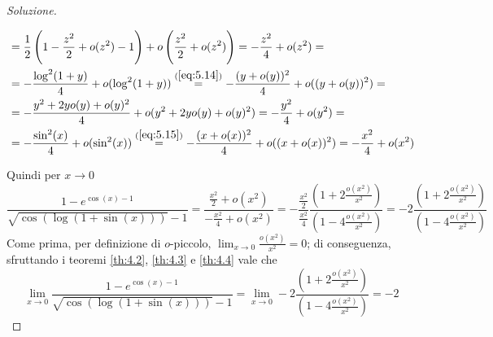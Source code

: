 \begin{proof}[Soluzione]
\begin{enumerate}[(i)]
\[\begin{split}
            & = \frac{1}{2}\left(1-\frac{z^2}{2}+o(z^2)-1\right)+o\left(\frac{z^2}{2}+o(z^2)\right) = -\frac{z^2}{4}+o(z^2) =\\
            & = -\frac{\log^2(1+y)}{4}+o(\log^2(1+y)) \overset{(\ref{eq:5.14})}{=} -\frac{(y+o(y))^2}{4} +o((y+o(y))^2) =  \\
            & = -\frac{y^2 +2yo(y)+o(y)^2}{4}+o(y^2 +2yo(y)+o(y)^2) = -\frac{y^2}{4}+o(y^2) = \\
            & = -\frac{\sin^2(x)}{4}+o(\sin^2(x)) \overset{(\ref{eq:5.15})}{=} -\frac{(x+o(x))^2}{4} + o((x+o(x))^2) = -\frac{x^2}{4}+o(x^2)
        \end{split}
        \]
    \end{enumerate}
    Quindi per $x\to 0$
    \[
    \frac{1-e^{\cos(x)-1}}{\sqrt{\cos(\log(1+\sin(x)))}-1} = \frac{\frac{x^2}{2}+o(x^2)}{-\frac{x^2}{4}+o(x^2)} = -\frac{\frac{x^2}{2}}{\frac{x^2}{4}}\frac{\left(1+2\frac{o(x^2)}{x^2}\right)}{\left(1-4\frac{o(x^2)}{x^2}\right)} = -2\frac{\left(1+2\frac{o(x^2)}{x^2}\right)}{\left(1-4\frac{o(x^2)}{x^2}\right)}
    \]
    Come prima, per definizione di $o$-piccolo, $\lim_{x\to 0} \frac{o(x^2)}{x^2} = 0$; di conseguenza, sfruttando i teoremi \ref{th:4.2}, \ref{th:4.3} e \ref{th:4.4} vale che
    \[
    \lim_{x\to 0} \frac{1-e^{\cos(x)-1}}{\sqrt{\cos(\log(1+\sin(x)))}-1} = \lim_{x\to 0}-2\frac{\left(1+2\frac{o(x^2)}{x^2}\right)}{\left(1-4\frac{o(x^2)}{x^2}\right)} = -2
    \]
\end{proof}
\newpage